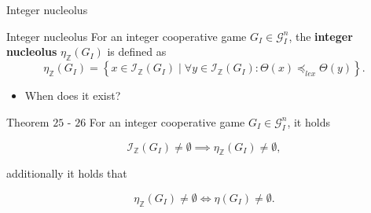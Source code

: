 \documentclass{beamer}
\newcommand{\Z}{\mathbb{Z}}
\begin{document}
\begin{frame}{Integer nucleolus}

    \begin{block}{Integer nucleolus}
        For an integer cooperative game $G_I \in \mathcal{G}_I^n$, the \textbf{integer nucleolus} $\eta_\Z(G_I)$ is defined as
        \begin{displaymath}
            \eta_{\Z}(G_I) = \left\{ x \in \mathcal{I}_\Z(G_I) \mid \forall y \in \mathcal{I}_\Z(G_I): \Theta(x) \preceq_{lex} \Theta(y)\right\}.
        \end{displaymath}
    \end{block}


    \begin{itemize}
        \item When does it exist?
    \end{itemize}


    \begin{block}{Theorem $25$ - $26$}
        For an integer cooperative game $G_I \in \mathcal{G}_I^n$, it holds

        \begin{displaymath}
            \mathcal{I}_{\Z}(G_I) \neq \emptyset \implies \eta_\Z(G_I) \neq \emptyset,
        \end{displaymath}

        additionally it holds that

        \begin{displaymath}
            \eta_\Z(G_I) \neq \emptyset \iff \eta(G_I) \neq \emptyset.
        \end{displaymath}
    \end{block}
\end{frame}


\end{document}
